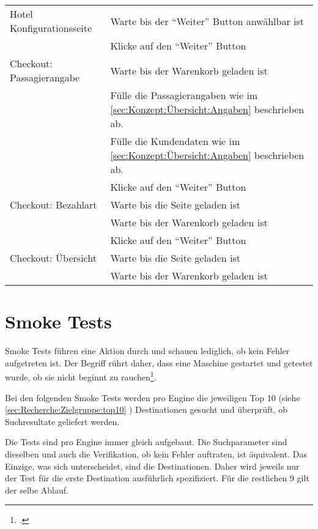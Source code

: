 \begin{table}[H]
\begin{tabularx}{0.9\textwidth}{ | l | X | }
		\multirow{1}{*}{Hotel Konfigurationsseite} & Warte bis der "`Weiter"' Button anwählbar ist \\ \cline{2-2}
		& Klicke auf den "`Weiter"' Button \\ \hline
		
		\multirow{1}{*}{Checkout: Passagierangabe} & Warte bis der Warenkorb geladen ist \\ \cline{2-2}
		& Fülle die Passagierangaben wie im \cref{sec:Konzept:Übersicht:Angaben} \nameref{sec:Konzept:Übersicht:Angaben} beschrieben ab. \\ \cline{2-2}
		& Fülle die Kundendaten wie im \cref{sec:Konzept:Übersicht:Angaben} \nameref{sec:Konzept:Übersicht:Angaben} beschrieben ab. \\ \cline{2-2}
		& Klicke auf den "`Weiter"' Button \\ \hline
		
		\multirow{1}{*}{Checkout: Bezahlart} & Warte bis die Seite geladen ist \\ \cline{2-2}
		& Warte bis der Warenkorb geladen ist \\ \cline{2-2}
		& Klicke auf den "`Weiter"' Button \\ \hline
		
		\multirow{1}{*}{Checkout: Übersicht} & Warte bis die Seite geladen ist \\ \cline{2-2}
		& Warte bis der Warenkorb geladen ist \\ \hline
	\end{tabularx} 
\end{table}

\section{Smoke Tests}
\label{sec:konzept:smoketests}
Smoke Tests führen eine Aktion durch und schauen lediglich, ob kein Fehler aufgetreten ist. Der Begriff rührt daher, dass eine Maschine gestartet und getestet wurde, ob sie nicht beginnt zu rauchen\footcite{Smoke_testing_software_-_Wikipedia_the_free_encyclopedia_2015-08-01}.

Bei den folgenden Smoke Tests werden pro Engine die jeweiligen Top 10 (siehe \cref{sec:Recherche:Zielgruppe:top10} ) Destinationen gesucht und überprüft, ob Suchresultate geliefert werden.

Die Tests sind pro Engine immer gleich aufgebaut. Die Suchparameter sind dieselben und auch die Verifikation, ob kein Fehler auftraten, ist äquivalent. Das Einzige, was sich unterscheidet, sind die Destinationen. Daher wird jeweils nur der Test für die erste Destination ausführlich spezifiziert. Für die restlichen 9 gilt der selbe Ablauf.


